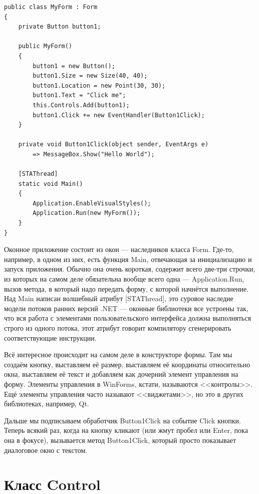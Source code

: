 \documentclass{../../text-style}
\begin{document}
\begin{verbatim}
public class MyForm : Form 
{
    private Button button1;

    public MyForm() 
    {
        button1 = new Button();
        button1.Size = new Size(40, 40);
        button1.Location = new Point(30, 30);
        button1.Text = "Click me";
        this.Controls.Add(button1);
        button1.Click += new EventHandler(Button1Click);
    }

    private void Button1Click(object sender, EventArgs e)
        => MessageBox.Show("Hello World");

    [STAThread]
    static void Main()
    {
        Application.EnableVisualStyles();
        Application.Run(new MyForm());
    }
}
\end{verbatim}

Оконное приложение состоит из окон --- наследников класса Form. Где-то, например, в одном из них, есть функция Main, отвечающая за инициализацию и запуск приложения. Обычно она очень короткая, содержит всего две-три строчки, из которых на самом деле обязательна вообще всего одна --- Application.Run, вызов метода, в который надо передать форму, с которой начнётся выполнение. Над Main написан волшебный атрибут [STAThread], это суровое наследие модели потоков ранних версий .NET --- оконные библиотеки все устроены так, что вся работа с элементами пользовательского интерфейса должна выполняться строго из одного потока, этот атрибут говорит компилятору сгенерировать соответствующие инструкции.

Всё интересное происходит на самом деле в конструкторе формы. Там мы создаём кнопку, выставляем её размер, выставляем её координаты относительно окна, выставляем её текст и добавляем как дочерний элемент управления на форму. Элементы управления в WinForms, кстати, называются <<контролы>>. Ещё элементы управления часто называют <<виджетами>>, но это в других библиотеках, например, Qt. 

Дальше мы подписываем обработчик Button1Click на событие Click кнопки. Теперь всякий раз, когда на кнопку кликают (или жмут пробел или Enter, пока она в фокусе), вызывается метод Button1Click, который просто показывает диалоговое окно с текстом.

\section{Класс Control}
\end{document}
